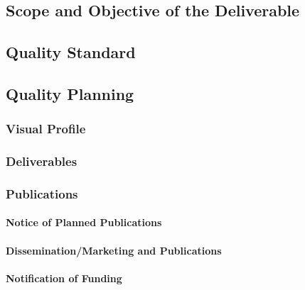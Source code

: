 \documentclass[
  11pt,
]{article}
\begin{document}
\hypertarget{scope-and-objective-of-the-deliverable}{%
\subsection{Scope and Objective of the
Deliverable}\label{scope-and-objective-of-the-deliverable}}

\hypertarget{quality-standard}{%
\subsection{Quality Standard}\label{quality-standard}}

\hypertarget{quality-planning-1}{%
\subsection{Quality Planning}\label{quality-planning-1}}

\hypertarget{visual-profile}{%
\subsubsection{Visual Profile}\label{visual-profile}}

\hypertarget{deliverables}{%
\subsubsection{Deliverables}\label{deliverables}}

\hypertarget{publications}{%
\subsubsection{Publications}\label{publications}}

\hypertarget{notice-of-planned-publications}{%
\paragraph{Notice of Planned
Publications}\label{notice-of-planned-publications}}

\hypertarget{disseminationmarketing-and-publications}{%
\paragraph{Dissemination/Marketing and
Publications}\label{disseminationmarketing-and-publications}}

\hypertarget{notification-of-funding}{%
\paragraph{Notification of Funding}\label{notification-of-funding}}
\end{document}
